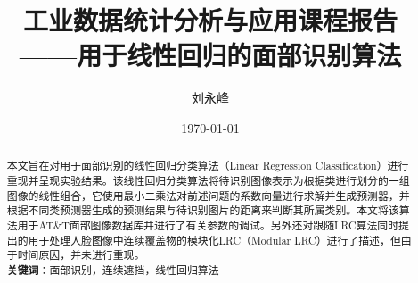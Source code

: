 \documentclass[UTF8]{ctexart}
\title{工业数据统计分析与应用课程报告\\——用于线性回归的面部识别算法}
\author{刘永峰}
\date{\today}
\begin{document}
\maketitle %
\begin{abstract}
    本文旨在对用于面部识别的线性回归分类算法（Linear Regression Classification）进行重现并呈现实验结果。该线性回归分类算法将待识别图像表示为根据类进行划分的一组图像的线性组合，它使用最小二乘法对前述问题的系数向量进行求解并生成预测器，并根据不同类预测器生成的预测结果与待识别图片的距离来判断其所属类别。本文将该算法用于AT\&T面部图像数据库并进行了有关参数的调试。另外还对跟随LRC算法同时提出的用于处理人脸图像中连续覆盖物的模块化LRC（Modular LRC）进行了描述，但由于时间原因，并未进行重现。\\
    \textbf{关键词}：面部识别，连续遮挡，线性回归算法
\end{abstract}
\end{document}
